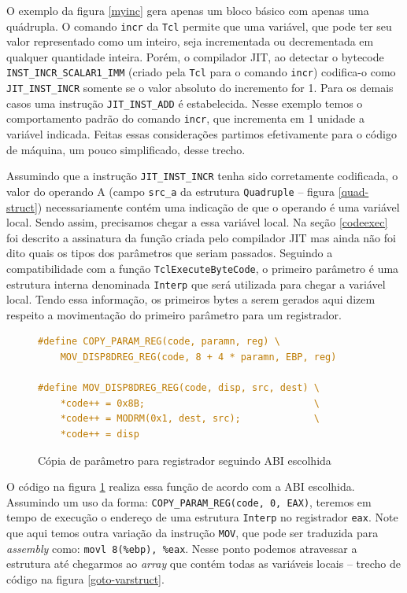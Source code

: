 O exemplo da figura \ref{myinc} gera apenas um bloco básico com
apenas uma quádrupla. O comando \verb!incr! da \texttt{Tcl} permite
que uma variável, que pode ter seu valor representado como um inteiro,
seja incrementada ou decrementada em qualquer quantidade inteira.
Porém, o compilador
JIT, ao detectar o bytecode \verb!INST_INCR_SCALAR1_IMM! (criado pela
\texttt{Tcl} para o comando \verb!incr!) codifica-o
como \verb!JIT_INST_INCR! somente se o valor absoluto do incremento
for 1. Para os demais casos uma instrução \verb!JIT_INST_ADD! é estabelecida.
Nesse exemplo temos o comportamento padrão do comando \verb!incr!, que
incrementa em 1 unidade a variável indicada. Feitas essas
considerações partimos efetivamente para o código de máquina, um pouco
simplificado, desse trecho.

Assumindo que a instrução \verb!JIT_INST_INCR! tenha sido corretamente
codificada, o valor do operando A (campo \verb!src_a! da estrutura
\verb!Quadruple! -- figura \ref{quad-struct}) necessariamente contém uma
indicação de que o operando é uma variável local. Sendo assim,
precisamos chegar a essa variável local. Na seção \ref{codeexec} foi
descrito a assinatura da função criada pelo compilador JIT mas ainda
não foi dito quais os tipos dos parâmetros que seriam
passados. Seguindo a compatibilidade com a função
\verb!TclExecuteByteCode!, o primeiro parâmetro é uma estrutura
interna denominada \verb!Interp! que será utilizada para chegar a
variável local. Tendo essa informação, os primeiros bytes a serem
gerados aqui dizem respeito a movimentação do primeiro parâmetro para
um registrador.
\begin{figure}[h]
  \centering
  \begin{lstlisting}[language=C]
#define COPY_PARAM_REG(code, paramn, reg) \
    MOV_DISP8DREG_REG(code, 8 + 4 * paramn, EBP, reg)

#define MOV_DISP8DREG_REG(code, disp, src, dest) \
    *code++ = 0x8B;                              \
    *code++ = MODRM(0x1, dest, src);             \
    *code++ = disp
  \end{lstlisting}
  \caption{Cópia de parâmetro para registrador seguindo ABI escolhida\label{copy-param}}
\end{figure}
O código na figura \ref{copy-param} realiza essa
função de acordo com a ABI escolhida. Assumindo um uso da forma:
\verb!COPY_PARAM_REG(code, 0, EAX)!, teremos em tempo de execução o
endereço de uma estrutura \verb!Interp! no registrador
\verb!eax!. Note que aqui temos outra variação da instrução
\verb!MOV!, que pode ser traduzida para \textit{assembly} como:
\verb!movl 8(%ebp), %eax!. Nesse ponto podemos atravessar a estrutura até
chegarmos ao \textit{array} que contém todas as variáveis locais --
trecho de código na figura \ref{goto-varstruct}.

